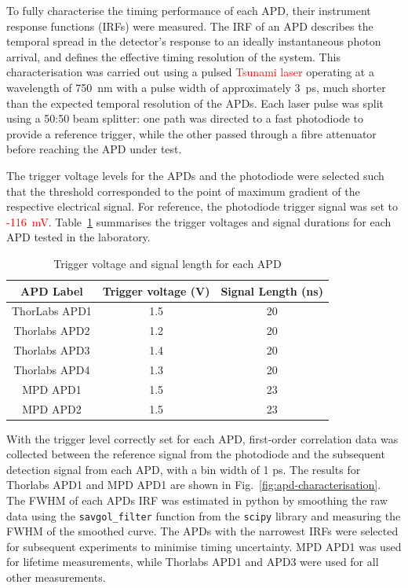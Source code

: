 To fully characterise the timing performance of each APD, their instrument response functions (IRFs) were measured. The IRF of an APD describes the temporal spread in the detector’s response to an ideally instantaneous photon arrival, and defines the effective timing resolution of the system. This characterisation was carried out using a pulsed \textcolor{red}{Tsunami laser} operating at a wavelength of 750~nm with a pulse width of approximately 3~ps, much shorter than the expected temporal resolution of the APDs. Each laser pulse was split using a 50:50 beam splitter: one path was directed to a fast photodiode to provide a reference trigger, while the other passed through a fibre attenuator before reaching the APD under test.

The trigger voltage levels for the APDs and the photodiode were selected such that the threshold corresponded to the point of maximum gradient of the respective electrical signal. For reference, the photodiode trigger signal was set to \textcolor{red}{-116~mV}. Table~\ref{tab:apd_characterisatoin} summarises the trigger voltages and signal durations for each APD tested in the laboratory.


\begin{table}[h!]
\centering
\begin{tabular}{|c|c|c|}
\hline
\textbf{APD Label} & \textbf{Trigger voltage (V)} & \textbf{Signal Length (ns)} \\
\hline
ThorLabs APD1 &     1.5        &      20        \\
\hline
Thorlabs APD2 &      1.2       &       20       \\
\hline
Thorlabs APD3 &      1.4       &       20       \\
\hline
Thorlabs APD4 &      1.3       &         20     \\
\hline
MPD APD1 &     1.5        &      23        \\
\hline
MPD APD2 &     1.5        &        23      \\
\hline
\end{tabular}
\caption{Trigger voltage and signal length for each APD}
\label{tab:apd_characterisatoin}
\end{table}

With the trigger level correctly set for each APD, first-order correlation data was collected between the reference signal from the photodiode and the subsequent detection signal from each APD, with a bin width of 1 ps. The results for Thorlabs APD1 and MPD APD1 are shown in Fig.~\ref{fig:apd-characterisation}. The FWHM of each APDs IRF was estimated in python by smoothing the raw data using the \texttt{savgol\_filter} function from the \texttt{scipy} library and measuring the FWHM of the smoothed curve. The APDs with the narrowest IRFs were selected for subsequent experiments to minimise timing uncertainty. MPD APD1 was used for lifetime measurements, while Thorlabs APD1 and APD3 were used for all other measurements.



